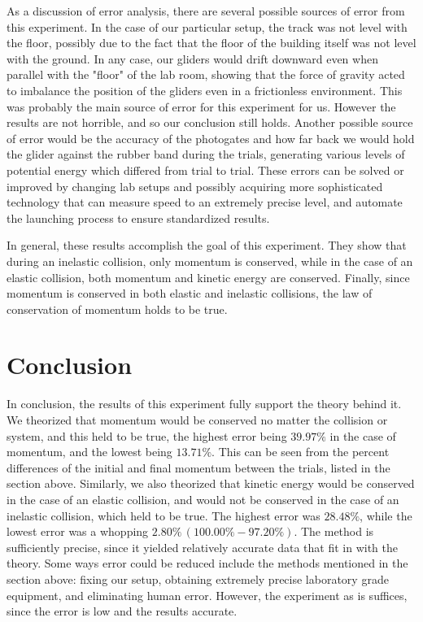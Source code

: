 \documentclass{article}
\theoremstyle{definition}
\begin{document}
As a discussion of error analysis, there are several possible sources of error from this experiment. In the case of our particular setup, the track
was not level with the floor, possibly due to the fact that the floor of the building itself was not level with the ground. In any case, our gliders would drift
downward even when parallel with the "floor" of the lab room, showing that the force of gravity acted to imbalance the position of the gliders even in a frictionless environment.
This was probably the main source of error for this experiment for us. However the results are not horrible, and so our conclusion still holds. Another possible source of
error would be the accuracy of the photogates and how far back we would hold the glider against the rubber band during the trials, generating various
levels of potential energy which differed from trial to trial. These errors can be solved or improved by changing lab setups and possibly acquiring more sophisticated technology
that can measure speed to an extremely precise level, and automate the launching process to ensure standardized results. 

In general, these results accomplish the goal of this experiment. They show that during an inelastic collision, only momentum is conserved,
while in the case of an elastic collision, both momentum and kinetic energy are conserved. Finally, since momentum is conserved in both elastic 
and inelastic collisions, the law of conservation of momentum holds to be true. 


\section{Conclusion}
In conclusion, the results of this experiment fully support the theory behind it. We theorized that momentum would be conserved no matter the collision or system, and this
held to be true, the highest error being $39.97\%$ in the case of momentum, and the lowest being $13.71\%$. This can be seen from the percent differences of the initial and final momentum between the trials, listed in the section above. Similarly, 
we also theorized that kinetic energy would be conserved in the case of an elastic collision, and would not be conserved in the case of an inelastic collision, which held to be true. 
The highest error was $28.48\%$, while the lowest error was a whopping $2.80\% \,(100.00\% - 97.20\%)$.
The method is sufficiently precise, since it yielded relatively accurate data that fit in with the theory. Some ways error could be reduced 
include the methods mentioned in the section above: fixing our setup, obtaining extremely precise laboratory grade equipment, and eliminating human error. 
However, the experiment as is suffices, since the error is low and the results accurate. 
\end{document}
